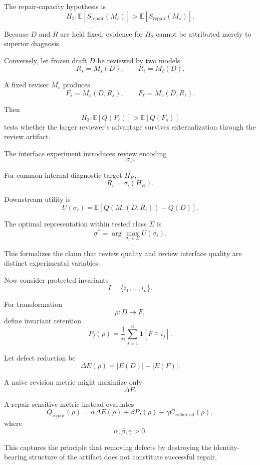 \documentclass[11pt]{article}
\begin{document}
The repair-capacity hypothesis is
\[
    H_2:
    \mathbb{E}
    [
        S_{\mathrm{repair}}(M_\ell)
    ]
    >
    \mathbb{E}
    [
        S_{\mathrm{repair}}(M_s)
    ].
\]

Because \(D\) and \(R\) are held fixed, evidence for \(H_2\) cannot be attributed merely to superior diagnosis.

Conversely, let frozen draft \(D\) be reviewed by two models:
\[
    R_s=M_s(D),
\qquad
    R_\ell=M_\ell(D).
\]

A fixed reviser \(M_v\) produces
\[
    F_s=M_v(D,R_s),
\qquad
    F_\ell=M_v(D,R_\ell).
\]

Then
\[
    H_3:
    \mathbb{E}[Q(F_\ell)]
    >
    \mathbb{E}[Q(F_s)]
\]
tests whether the larger reviewer's advantage survives externalization through the review artifact.

The interface experiment introduces review encoding
\[
    \sigma_i.
\]

For common internal diagnostic target \(H_R\),
\[
    R_i
    =
    \sigma_i(H_R).
\]

Downstream utility is
\[
    U(\sigma_i)
    =
    \mathbb{E}
    \left[
        Q(
            M_v(D,R_i)
        )
        -
        Q(D)
    \right].
\]

The optimal representation within tested class \(\Sigma\) is
\[
    \sigma^\ast
    =
    \arg\max_{\sigma_i\in\Sigma}
    U(\sigma_i).
\]

This formalizes the claim that review quality and review interface quality are distinct experimental variables.

Now consider protected invariants
\[
    I
    =
    \{i_1,\ldots,i_n\}.
\]

For transformation
\[
    \rho:D\rightarrow F,
\]
define invariant retention
\[
    P_I(\rho)
    =
    \frac{1}{n}
    \sum_{j=1}^{n}
    \mathbf{1}
    [
        F\models i_j
    ].
\]

Let defect reduction be
\[
    \Delta E(\rho)
    =
    |E(D)|-|E(F)|.
\]

A naive revision metric might maximize only
\[
    \Delta E.
\]

A repair-sensitive metric instead evaluates
\[
    Q_{\mathrm{repair}}(\rho)
    =
    \alpha\Delta E(\rho)
    +
    \beta P_I(\rho)
    -
    \gamma C_{\mathrm{collateral}}(\rho),
\]
where
\[
    \alpha,\beta,\gamma>0.
\]

This captures the principle that removing defects by destroying the identity-bearing structure of the artifact does not constitute successful repair.
\end{document}
